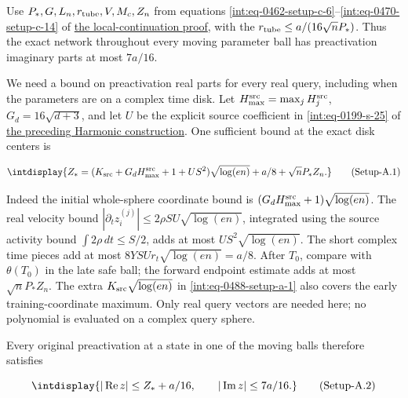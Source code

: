 Use \(P_*,\allowbreak G,\allowbreak L_n,\allowbreak r_{\rm tube},\allowbreak V,\allowbreak M_c,\allowbreak Z_n\) from equations \hyperref[int:eq-setup-c-6]{\eqref{int:eq-0462-setup-c-6}}--\allowbreak \hyperref[int:eq-setup-c-14]{\eqref{int:eq-0470-setup-c-14}} of \hyperref[int:setup-core]{the local-continuation proof}, with the \(r_{\rm tube}\le a/(16\sqrt nP_*)\). Thus the exact network throughout every moving parameter ball has preactivation imaginary parts at most \(7a/16\).



We need a bound on preactivation real parts for every real query, including when the parameters are on a complex time disk. Let \(H_{\max}^{\rm src}=\max_jH_j^{\rm src}\), \(G_d=16\sqrt{d+3}\), and let \(U\) be the explicit source coefficient in \eqref{int:eq-0199-s-25} of \hyperref[int:harmonic-construction]{the preceding Harmonic construction}. One sufficient bound at the exact disk centers is


\label{int:eq-setup-a-1}
\begingroup\renewcommand{\theHequation}{intdisplay.961}
\begin{equation}
\intdisplay{
Z_*=(K_{\rm src}+G_dH_{\max}^{\rm src}+1+US^2)\sqrt{\log(en)}
       +a/8+\sqrt nP_*Z_n.
}
\tag{Setup-A.1}
\label{int:eq-0488-setup-a-1}
\end{equation}
\endgroup


Indeed the initial whole-sphere coordinate bound is \((G_dH_{\max}^{\rm src}+1)\sqrt{\log(en)}\). The real velocity bound \(|\partial_tz_i^{(j)}|\le2\rho SU\sqrt{\log(en)}\), integrated using the source activity bound \(\int2\rho\,\allowbreak dt\le S/2\), adds at most \(US^2\sqrt{\log(en)}\). The short complex time pieces add at most \(8YSUr_t\sqrt{\log(en)}=a/8\). After \(T_0\), compare with \(\theta(T_0)\) in the late safe ball; the forward endpoint estimate adds at most \(\sqrt nP_*Z_n\). The extra \(K_{\rm src}\sqrt{\log(en)}\) in \hyperref[int:eq-setup-a-1]{\eqref{int:eq-0488-setup-a-1}} also covers the early training-coordinate maximum. Only real query vectors are needed here; no polynomial is evaluated on a complex query sphere.



Every original preactivation at a state in one of the moving balls therefore satisfies


\label{int:eq-setup-a-2}
\begingroup\renewcommand{\theHequation}{intdisplay.962}
\begin{equation}
\intdisplay{
|\operatorname{Re}z|\le Z_*+a/16,\qquad
|\operatorname{Im}z|\le7a/16.
}
\tag{Setup-A.2}
\label{int:eq-0489-setup-a-2}
\end{equation}
\endgroup

